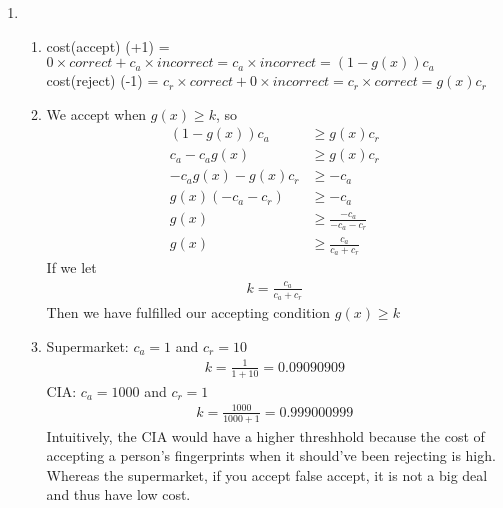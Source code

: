 \documentclass{article}
\begin{document}
\begin{enumerate}
        \item \begin{enumerate}[label=(\alph*)]
            \item cost(accept) (+1) = $0 \times correct + c_a \times incorrect = c_a \times incorrect = (1 - g(x))c_a$\\
            cost(reject) (-1) = $c_r \times correct + 0 \times incorrect = c_r \times correct = g(x)c_r$
            \item We accept when $g(x) \geq k$, so 
            \begin{align*}
                (1 - g(x))c_a &\geq g(x)c_r \\
                c_a - c_ag(x) &\geq g(x)c_r \\
                -c_ag(x) - g(x)c_r &\geq -c_a\\
                g(x)(-c_a - c_r) &\geq -c_a \\
                g(x) &\geq \frac{-c_a}{-c_a - c_r}\\
                g(x) &\geq \frac{c_a}{c_a + c_r}
            \end{align*}
            If we let
            \begin{align*}
                k = \frac{c_a}{c_a + c_r}
            \end{align*}
            Then we have fulfilled our accepting condition $g(x) \geq k$
            \item Supermarket: $c_a = 1$ and $c_r = 10$
            \begin{align*}
                k = \frac{1}{1 + 10} = 0.09090909
            \end{align*}
            CIA: $c_a = 1000$ and $c_r = 1$
            \begin{align*}
                k = \frac{1000}{1000 + 1} = 0.999000999
            \end{align*}
            Intuitively, the CIA would have a higher threshhold because the cost of accepting a person's fingerprints when it should've been rejecting is high. Whereas the supermarket, if you accept false accept, it is not a big deal and thus have low cost.
        \end{enumerate}
    \end{enumerate}
\end{document}
